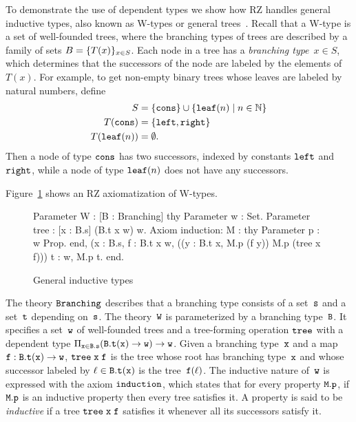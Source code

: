 To demonstrate the use of dependent types we show how RZ handles
general inductive types, also known as W-types or general
trees~\cite{nordstroem90:_progr_martin_type_theor}. Recall that a
W-type is a set of well-founded trees, where the branching types of
trees are described by a family of sets $B = \{T(x)\}_{x \in S}$.
Each node in a tree has a \emph{branching type}~$x \in S$, which
determines that the successors of the node are labeled by the elements
of~$T(x)$.
%
\iflong
%
For example, to get non-empty binary trees whose leaves are
labeled by natural numbers, define
%
\begin{align*}
  S &= \{\mathtt{cons}\} \cup \{\mathtt{leaf}(n) \mid n \in \mathbb{N}\}
  \\
  T(\mathtt{cons}) &= \{\mathtt{left}, \mathtt{right}\}
  \\
  T(\mathtt{leaf}(n)) &= \emptyset.
\end{align*}
%
Then a node of type $\mathtt{cons}$ has two successors, indexed by
constants $\mathtt{left}$ and $\mathtt{right}$, while a node of type
$\mathtt{leaf}(n)$ does not have any successors.
\par
%
\fi %
%
Figure~\ref{fig:wtype} shows an RZ axiomatization of W-types.
%
\begin{figure}
\begin{source}
Parameter W : [B : Branching] \iTo
thy
  Parameter w : Set.
  Parameter tree : [x : B.s] \iTo (B.t x \iTo w) \iTo w.
  Axiom induction:
    \iForall M : thy Parameter p : w \iTo Prop. end,
    (\iForall x : B.s, \iForall f : B.t x \iTo w,
       ((\iForall y : B.t x, M.p (f y)) \iTo M.p (tree x f))) \iTo
    \iForall t : w, M.p t.
end.
\end{source}
  \caption{General inductive types}
  \label{fig:wtype}
\end{figure}
%
The theory $\mathtt{Branching}$ describes that a branching type
consists of a set~$\mathtt{s}$ and a set~$\mathtt{t}$ depending on~$\mathtt{s}$. The theory~$\mathtt{W}$ is
parameterized by a branching type~$\mathtt{B}$. It specifies a set~$\mathtt{w}$ of
well-founded trees and a tree-forming operation $\mathtt{tree}$ with a
dependent type $\Pi_{\mathtt{x} \in \mathtt{B.s}} (\mathtt{B.t(x)} \to \mathtt{w}) \to \mathtt{w}$.
%
\iflong
%
Given a
branching type~$\mathtt{x}$ and a map $\mathtt{f} : \mathtt{B.t(x)} \to \mathtt{w}$, $\mathtt{tree}\;\mathtt{x}\;\mathtt{f}$
is the tree whose root has branching type~$\mathtt{x}$ and whose successor
labeled by $\ell \in \mathtt{B.t}(\mathtt{x})$ is the tree~$\mathtt{f}(\ell)$.
%
\fi
%
The inductive nature of~$\mathtt{w}$ is expressed with the axiom
$\mathtt{induction}$, which states that for every property $\mathtt{M.p}$, if $\mathtt{M.p}$
is an inductive property then every tree satisfies it. A property is
said to be \emph{inductive} if a tree $\mathtt{tree}\;\mathtt{x}\;\mathtt{f}$ satisfies it
whenever all its successors satisfy it.

